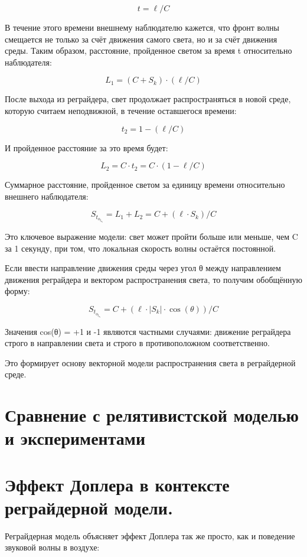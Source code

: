 \documentclass[12pt]{article}
\begin{document}
\[
t = \ell / C
\]

В течение этого времени внешнему наблюдателю кажется, что фронт волны смещается не только за счёт движения самого света, но и за счёт движения среды. Таким образом, расстояние, пройденное светом за время t относительно наблюдателя:

\[
L_1 = (C + S_k) \cdot (\ell / C)
\]

После выхода из реграйдера, свет продолжает распространяться в новой среде, которую считаем неподвижной, в течение оставшегося времени:

\[
t_2 = 1 - (\ell / C)
\]

И пройденное расстояние за это время будет:

\[
L_2 = C \cdot t_2 = C \cdot (1 - \ell / C)
\]

Суммарное расстояние, пройденное светом за единицу времени относительно внешнего наблюдателя:

\[
S_t_o_t_a_l = L_1 + L_2 = C + (\ell \cdot S_k) / C
\]

Это ключевое выражение модели: свет может пройти больше или меньше, чем C за 1 секунду, при том, что локальная скорость волны остаётся постоянной.
\par
Если ввести направление движения среды через угол θ между направлением движения реграйдера и вектором распространения света, то получим обобщённую форму:

\[
S_t_o_t_a_l = C + (\ell \cdot \left|S_k\right| \cdot \cos(\theta)) / C
\]

Значения cos(θ) = +1 и -1 являются частными случаями: движение реграйдера строго в направлении света и строго в противоположном соответственно.
\par
Это формирует основу векторной модели распространения света в реграйдерной среде.

\section*{Сравнение с релятивистской моделью и экспериментами}
\section*{Эффект Доплера в контексте реграйдерной модели.}


Реграйдерная модель объясняет эффект Доплера так же просто, как и поведение звуковой волны в воздухе:
\end{document}
